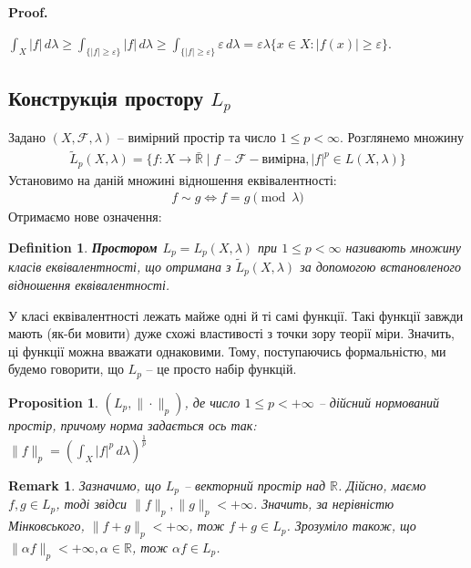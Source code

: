\documentclass[a4paper, 10pt]{article}
\makeatletter
\theoremstyle{theoremdd}
\newtheorem{definition}[theorem]{Definition}
\newtheorem{proposition}[theorem]{Proposition}
\newtheorem{remark}[theorem]{Remark}
\renewenvironment{proof}[1][Proof.\\]{\par
\pushQED{\hfill \qed}%
\normalfont \topsep6\p@\@plus6\p@\relax
\trivlist
\item\relax
{\bfseries
#1\@addpunct{.}}\hspace\labelsep\ignorespaces
}{%
\popQED\endtrivlist\@endpefalse
}
\makeatother
\begin{document}
\begin{proof}
$\displaystyle\int_X |f|\,d\lambda \geq \int_{\{|f| \geq \varepsilon\}} |f|\,d\lambda \geq \int_{\{ |f| \geq \varepsilon \}} \varepsilon \,d\lambda = \varepsilon \lambda \{x \in X: |f(x)| \geq \varepsilon \}$.
\end{proof}

\subsection{Конструкція простору $L_p$}
Задано $(X,\mathcal{F},\lambda)$ -- вимірний простір та число $1 \leq p < \infty$. Розглянемо множину
\begin{align*}
\tilde{L}_p(X,\lambda) = \{f \colon X \to \bar{\mathbb{R}} \mid f \text{ -- } \mathcal{F}-\text{вимірна}, |f|^p \in L(X,\lambda) \}
\end{align*}
Установимо на даній множині відношення еквівалентності:
\begin{align*}
f \sim g \iff f = g \pmod \lambda
\end{align*}
Отримаємо нове означення:
\begin{definition}
\textbf{Простором $L_p = L_p(X,\lambda)$} при $1 \leq p < \infty$ називають множину класів еквівалентності, що отримана з $\tilde{L}_p(X,\lambda)$ за допомогою встановленого відношення еквівалентності.
\end{definition}

\noindent У класі еквівалентності лежать майже одні й ті самі функції. Такі функції завжди мають (як-би мовити) дуже схожі властивості з точки зору теорії міри. Значить, ці функції можна вважати однаковими. Тому, поступаючись формальністю, ми будемо говорити, що $L_p$ -- це просто набір функцій.

\begin{proposition}
$(L_p, \|\cdot \|_p)$, де число $1 \leq p <+\infty$ -- дійсний нормований простір, причому норма задається ось так:\\
$\| f \|_p = \displaystyle\left( \int_X |f|^p\,d\lambda \right)^{\frac{1}{p}}$
\end{proposition}

\begin{remark}
Зазначимо, що $L_p$ -- векторний простір над $\mathbb{R}$. Дійсно, маємо $f,g \in L_p$, тоді звідси $\|f\|_p, \|g\|_p < +\infty$. Значить, за нерівністю Мінковського, $\|f+g\|_p < +\infty$, тож $f+g \in L_p$. Зрозуміло також, що $\|\alpha f\|_p < +\infty, \alpha \in \mathbb{R}$, тож $\alpha f \in L_p$.
\end{remark}
\end{document}
